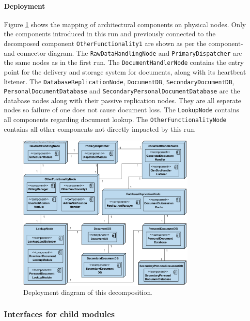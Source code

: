 \documentclass[a4paper,10pt]{article}
\begin{document}
\paragraph{Deployment}
Figure \ref{fig:it2-depl_main} shows the mapping of architectural components on physical nodes. Only the components introduced in this run and previously connected to the decomposed component \texttt{OtherFunctionality1} are shown as per the component-and-connector diagram. The \texttt{RawDataHandlingNode} and \texttt{PrimaryDispatcher} are the same nodes as in the first run. The \texttt{DocumentHandlerNode} contains the entry point for the delivery and storage system for documents, along with its heartbeat listener. The \texttt{DatabaseReplicationNode}, \texttt{DocumentDB}, \texttt{SecondaryDocumentDB}, \texttt{PersonalDocumentDatabase} and \texttt{SecondaryPersonalDocumentDatabase} are the database nodes along with their passive replication nodes. They are all seperate nodes so failure of one does not cause document loss. The \texttt{LookupNode} contains all components regarding document lookup. The \texttt{OtherFunctionalityNode} contains all other components not directly impacted by this run.

\begin{figure}[!htp]
    \centering
    \includegraphics[width=0.8\textwidth]{depl_diag_2.png}
    \caption{Deployment diagram of this decomposition.
        }\label{fig:it2-depl_main}
\end{figure}

\subsubsection{Interfaces for child modules}
\end{document}
